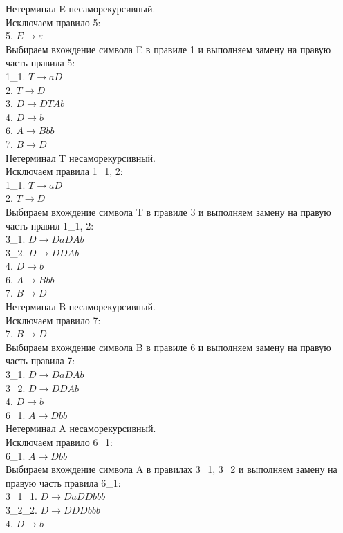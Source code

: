 \documentclass[a4paper,14pt]{extarticle}
\begin{document}
\begin{enumerate}[1.]
Нетерминал E несаморекурсивный.\\
Исключаем правило 5:\\
5. $E \rightarrow \varepsilon$\\
Выбираем вхождение символа E в правиле 1 и
выполняем замену на правую часть правила 5:\\
1\_1. $T \rightarrow aD$\\
2. $T \rightarrow D$\\
3. $D \rightarrow DTAb$\\
4. $D \rightarrow b$\\
6. $A \rightarrow Bbb$\\
7. $B \rightarrow D$\\

Нетерминал T несаморекурсивный.\\
Исключаем правила 1\_1, 2:\\
1\_1. $T \rightarrow aD$\\
2. $T \rightarrow D$\\
Выбираем вхождение символа T в правиле 3 и
выполняем замену на правую часть правил 1\_1, 2:\\
3\_1. $D \rightarrow DaDAb$\\
3\_2. $D \rightarrow DDAb$\\
4. $D \rightarrow b$\\
6. $A \rightarrow Bbb$\\
7. $B \rightarrow D$\\

Нетерминал B несаморекурсивный.\\
Исключаем правило 7:\\
7. $B \rightarrow D$\\
Выбираем вхождение символа B в правиле 6 и
выполняем замену на правую часть правила 7:\\
3\_1. $D \rightarrow DaDAb$\\
3\_2. $D \rightarrow DDAb$\\
4. $D \rightarrow b$\\
6\_1. $A \rightarrow Dbb$\\

Нетерминал A несаморекурсивный.\\
Исключаем правило 6\_1:\\
6\_1. $A \rightarrow Dbb$\\
Выбираем вхождение символа A в правилах 3\_1, 3\_2 и
выполняем замену на правую часть правила 6\_1:\\
3\_1\_1. $D \rightarrow DaDDbbb$\\
3\_2\_2. $D \rightarrow DDDbbb$\\
4. $D \rightarrow b$\\


\end{enumerate}
\end{document}
